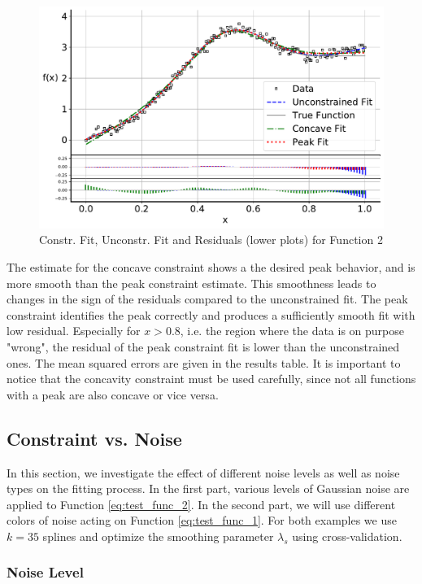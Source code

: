 \documentclass[10pt,a4paper]{article}
\begin{document}
\begin{figure}[H]
	\centering
	\includegraphics[width=\columnwidth]{../thesisplots/exp_peak_fit.pdf}
	\caption{Constr. Fit, Unconstr. Fit and Residuals (lower plots) for Function 2}
	\label{fig:test_func_2_fit}
\end{figure}
 
The estimate for the concave constraint shows a the desired peak behavior, and is more smooth than the peak constraint estimate. This smoothness leads to changes in the sign of the residuals compared to the unconstrained fit. The peak constraint identifies the peak correctly and produces a sufficiently smooth fit with low residual. Especially for $x >0.8$, i.e. the region where the data is on purpose "wrong", the residual of the peak constraint fit is lower than the unconstrained ones. The mean squared errors are given in the results table. 
It is important to notice that the concavity constraint must be used carefully, since not all functions with a peak are also concave or vice versa.

\subsection{Constraint vs. Noise}

In this section, we investigate the effect of different noise levels as well as noise types on the fitting process. In the first part, various levels of Gaussian noise are applied to Function \ref{eq:test_func_2}. In the second part, we will use different colors of noise acting on Function \ref{eq:test_func_1}. For both examples we use $k=35$ splines and optimize the smoothing parameter $\lambda_s$ using cross-validation. 

\subsubsection{Noise Level}
\end{document}
